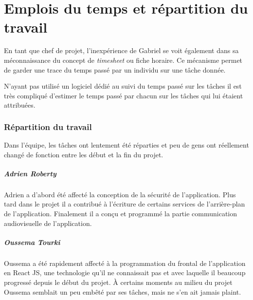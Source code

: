 \chapter{Emplois du temps et répartition du travail}



En tant que chef de projet, l'inexpérience de Gabriel
se voit également dans sa méconnaissance du concept de
\textit{timesheet} ou fiche horaire. Ce mécanisme permet
de garder une trace du temps passé par un individu sur
une tâche donnée.

N'ayant pas utilisé un logiciel dédié au suivi du temps
passé sur les tâches il est très compliqué d'estimer le
temps passé par chacun sur les tâches qui lui étaient
attribuées.

\subsection{Répartition du travail}

Dans l'équipe, les tâches ont lentement été réparties et peu de gens ont
réellement changé de fonction entre les début et la fin du projet.

\paragraph{Adrien Roberty} Adrien a d'abord été affecté la conception de
la sécurité de l'application. Plus tard dans le projet il a contribué à
l'écriture de certains services de l'arrière-plan de l'application.
Finalement il a conçu et programmé la partie communication audiovisuelle
de l'application.

\paragraph{Oussema Tourki} Oussema a été rapidement affecté à la programmation
du frontal de l'application en React JS, une technologie qu'il ne connaissait
pas et avec laquelle il beaucoup progressé depuis le début du projet. À
certains moments au milieu du projet Oussema semblait un peu embêté par ses
tâches, mais ne s'en ait jamais plaint.

